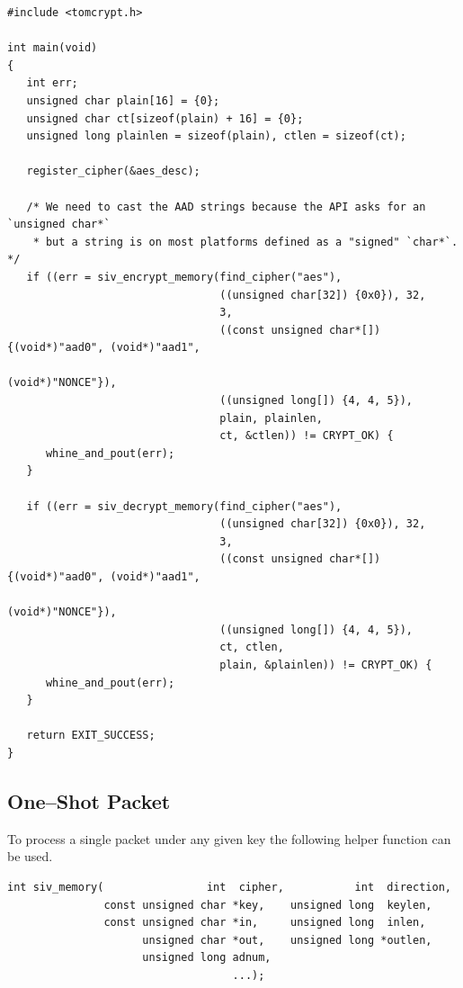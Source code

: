 \documentclass[synpaper]{book}
\begin{document}
\begin{small}
\begin{verbatim}
#include <tomcrypt.h>

int main(void)
{
   int err;
   unsigned char plain[16] = {0};
   unsigned char ct[sizeof(plain) + 16] = {0};
   unsigned long plainlen = sizeof(plain), ctlen = sizeof(ct);

   register_cipher(&aes_desc);

   /* We need to cast the AAD strings because the API asks for an `unsigned char*`
    * but a string is on most platforms defined as a "signed" `char*`. */
   if ((err = siv_encrypt_memory(find_cipher("aes"),
                                 ((unsigned char[32]) {0x0}), 32,
                                 3,
                                 ((const unsigned char*[]) {(void*)"aad0", (void*)"aad1",
                                                            (void*)"NONCE"}),
                                 ((unsigned long[]) {4, 4, 5}),
                                 plain, plainlen,
                                 ct, &ctlen)) != CRYPT_OK) {
      whine_and_pout(err);
   }

   if ((err = siv_decrypt_memory(find_cipher("aes"),
                                 ((unsigned char[32]) {0x0}), 32,
                                 3,
                                 ((const unsigned char*[]) {(void*)"aad0", (void*)"aad1",
                                                            (void*)"NONCE"}),
                                 ((unsigned long[]) {4, 4, 5}),
                                 ct, ctlen,
                                 plain, &plainlen)) != CRYPT_OK) {
      whine_and_pout(err);
   }

   return EXIT_SUCCESS;
}
\end{verbatim}
\end{small}

\subsection{One--Shot Packet}
To process a single packet under any given key the following helper function can be used.

\begin{verbatim}
int siv_memory(                int  cipher,           int  direction,
               const unsigned char *key,    unsigned long  keylen,
               const unsigned char *in,     unsigned long  inlen,
                     unsigned char *out,    unsigned long *outlen,
                     unsigned long adnum,
                                   ...);
\end{verbatim}
\end{document}
